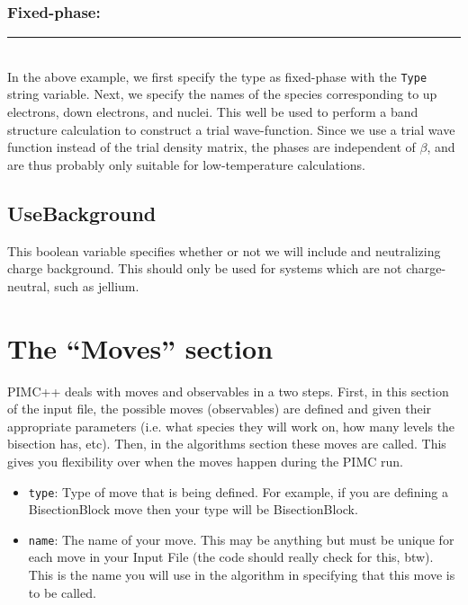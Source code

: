 \documentclass{book}
\begin{document}
\subsubsection{Fixed-phase:}
\rule{0.0cm}{0.75cm}\rule{0.6cm}{0cm}\\
In the above example, we first specify the type as fixed-phase with
the \texttt{Type} string variable.  Next, we specify the names of the
species corresponding to up electrons, down electrons, and nuclei.
This well be used to perform a band structure calculation to construct
a trial wave-function.  Since we use a trial wave function instead of
the trial density matrix, the phases are independent of $\beta$, and
are thus probably only suitable for low-temperature calculations.

\subsection{UseBackground}
This boolean variable specifies whether or not we will include and
neutralizing charge background.  This should only be used for systems
which are not charge-neutral, such as jellium.

\section{The ``Moves'' section}

PIMC++ deals with moves and observables in a two steps. First, in this
section of the input file, the possible moves (observables) are
defined and given their appropriate parameters (i.e. what species they
will work on, how many levels the bisection has, etc).  Then, in the
algorithms section these moves are called.  This gives you flexibility
over when the moves happen during the PIMC run.  

\begin{itemize}
   \item \texttt{type}:  Type of move that is being
   defined.  For example, if you are defining a BisectionBlock move
   then your type will be BisectionBlock.

   \item \texttt{name}:  The name of your move. This may be anything
   but must be unique for each move in your Input File (the code should
   really check for this, btw).  This is the name you will use in the
   algorithm in specifying that this move is to be called.

\end{itemize}
\end{document}

